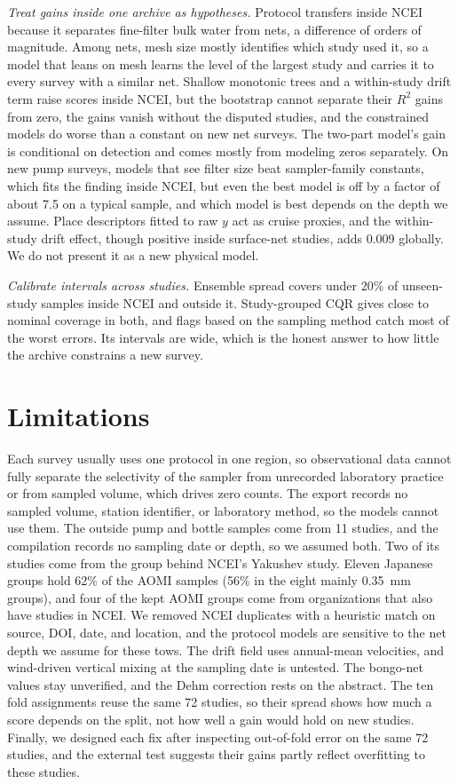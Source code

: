 \documentclass[12pt,a4paper]{report}
\newcommand{\Rsq}{$R^2$}
\begin{document}
\emph{Treat gains inside one archive as hypotheses.} Protocol transfers inside NCEI because it separates fine-filter bulk water from nets, a difference of orders of magnitude. Among nets, mesh size mostly identifies which study used it, so a model that leans on mesh learns the level of the largest study and carries it to every survey with a similar net. Shallow monotonic trees and a within-study drift term raise scores inside NCEI, but the bootstrap cannot separate their \Rsq{} gains from zero, the gains vanish without the disputed studies, and the constrained models do worse than a constant on new net surveys. The two-part model's gain is conditional on detection and comes mostly from modeling zeros separately. On new pump surveys, models that see filter size beat sampler-family constants, which fits the finding inside NCEI, but even the best model is off by a factor of about 7.5 on a typical sample, and which model is best depends on the depth we assume. Place descriptors fitted to raw $y$ act as cruise proxies, and the within-study drift effect, though positive inside surface-net studies, adds 0.009 globally. We do not present it as a new physical model.

\emph{Calibrate intervals across studies.} Ensemble spread covers under 20\% of unseen-study samples inside NCEI and outside it. Study-grouped CQR gives close to nominal coverage in both, and flags based on the sampling method catch most of the worst errors. Its intervals are wide, which is the honest answer to how little the archive constrains a new survey.

\section{Limitations}

Each survey usually uses one protocol in one region, so observational data cannot fully separate the selectivity of the sampler from unrecorded laboratory practice or from sampled volume, which drives zero counts. The export records no sampled volume, station identifier, or laboratory method, so the models cannot use them. The outside pump and bottle samples come from 11 studies, and the compilation records no sampling date or depth, so we assumed both. Two of its studies come from the group behind NCEI's Yakushev study. Eleven Japanese groups hold 62\% of the AOMI samples (56\% in the eight mainly 0.35~mm groups), and four of the kept AOMI groups come from organizations that also have studies in NCEI. We removed NCEI duplicates with a heuristic match on source, DOI, date, and location, and the protocol models are sensitive to the net depth we assume for these tows. The drift field uses annual-mean velocities, and wind-driven vertical mixing at the sampling date is untested. The bongo-net values stay unverified, and the Dehm correction rests on the abstract. The ten fold assignments reuse the same 72 studies, so their spread shows how much a score depends on the split, not how well a gain would hold on new studies. Finally, we designed each fix after inspecting out-of-fold error on the same 72 studies, and the external test suggests their gains partly reflect overfitting to these studies.
\end{document}

